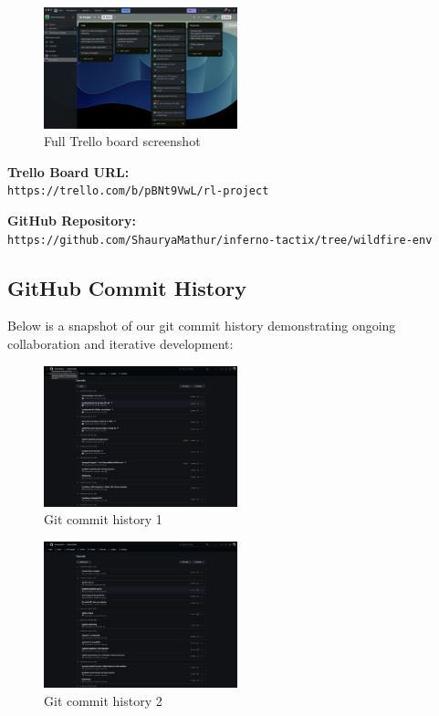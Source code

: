 \documentclass[conference]{IEEEtran}
\begin{document}
\begin{figure}[H]
    \centering
    \includegraphics[width=0.5\textwidth]{trello_rl.png}
    \caption{Full Trello board screenshot}
    \end{figure}

\vspace{-0.3cm}
\noindent\textbf{Trello Board URL:} \\
\texttt{https://trello.com/b/pBNt9VwL/rl-project}

\vspace{0.3cm}
\noindent\textbf{GitHub Repository:} \\
\texttt{https://github.com/ShauryaMathur/inferno-tactix/tree/wildfire-env}

\subsection{GitHub Commit History}
\hspace{-0.4cm}Below is a snapshot of our git commit history demonstrating ongoing collaboration and iterative development:

\begin{figure}[H]
\centering
\includegraphics[width=0.5\textwidth]{git1.png}
\caption{Git commit history 1}
\end{figure}

\begin{figure}[H]
    \centering
    \includegraphics[width=0.5\textwidth]{git2.png}
    \caption{Git commit history 2}
    \end{figure}
\end{document}

